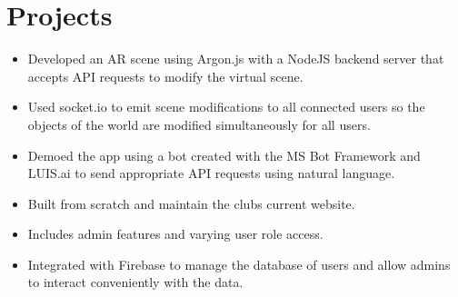 \documentclass{resume}
\begin{document}
\begin{minipage}[t]{0.63\linewidth}
\section{Projects}
\begin{itemize}
    \item Developed an AR scene using Argon.js with a NodeJS backend server that accepts API requests to modify the virtual scene.
    \item Used socket.io to emit scene modifications to all connected users so the objects of the world are modified simultaneously for all users.
    \item Demoed the app using a bot created with the MS Bot Framework and LUIS.ai to send appropriate API requests using natural language.
\end{itemize}
\begin{itemize}
    \item Built from scratch and maintain the clubs current website.
    \item Includes admin features and varying user role access.
    \item Integrated with Firebase to manage the database of users and allow admins to interact conveniently with the data.
\end{itemize}

\end{minipage}
\end{document}
